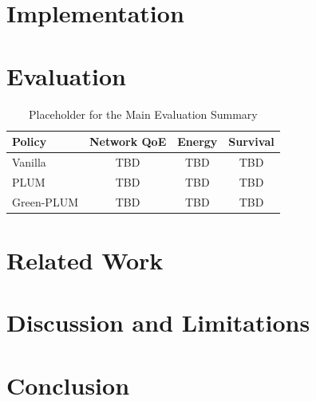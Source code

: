 \documentclass[journal]{IEEEtran}
\begin{document}
\section{Implementation}

\section{Evaluation}

\begin{table}[t]
  \caption{Placeholder for the Main Evaluation Summary}
  \label{tab:summary}
  \centering
  \begin{tabular}{lccc}
    \toprule
    Policy & Network QoE & Energy & Survival \\
    \midrule
    Vanilla & TBD & TBD & TBD \\
    PLUM & TBD & TBD & TBD \\
    Green-PLUM & TBD & TBD & TBD \\
    \bottomrule
  \end{tabular}
\end{table}

\section{Related Work}

\section{Discussion and Limitations}

\section{Conclusion}



\end{document}

